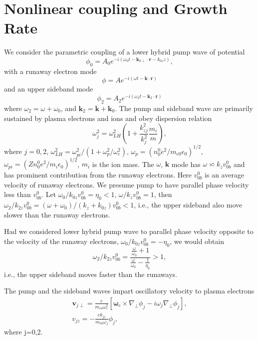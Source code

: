 \documentclass[aip,pop,amsmath,amssymb,showpacs,reprint,floatfix,lengthcheck]{revtex4-1}
\begin{document}
\section{Nonlinear coupling and Growth Rate}
We consider the parametric coupling of a lower hybrid pump wave of potential 
\begin{equation}
\phi_{0}=A_{0} e^{-i(\omega_{0} t -\textbf{k}_{0\perp}\cdot\textbf{r}-k_{0z}z)}, 
\end{equation}
with a runaway electron mode
 \begin{equation}
 \phi=Ae^{-i(\omega t-\textbf{k}\cdot\textbf{r})}
\end{equation}
and an upper sideband mode
\begin{equation}
\phi_{2}=A_{2}e^{-i(\omega_{2} t-\textbf{k}_{2}\cdot\textbf{r})} 
\end{equation}
 where 
 $\omega_{2}=\omega+\omega_{0}$, and $\textbf{k}_{2}=\textbf{k}+\textbf{k}_{0}$.
The pump and sideband wave are primarily sustained by plasma electrons and ions and obey dispersion relation
\begin{equation}
 \omega_{j}^2=\omega_{LH}^2(1+\frac{k_{zj}^2}{k_{j}^2}\frac{m_{i}}{m}),
\end{equation}
where $j=0,2$, $\omega_{LH}^2=\omega_{pi}^2/(1+\omega_{p}^2/\omega_{c}^2)$, $\omega_{p}=(n_{0}^{0}e^2/m_{e0}\epsilon_{0})^{1/2}$, $\omega_{pi}=(Zn_{0}^{0}e^2/m_{i}\epsilon_{0})^{1/2}$, $m_{i}$ is the ion mass.
The $\omega$, $\textbf{k}$ mode has $\omega\backsimeq k_{z}v_{0b}^{0}$ and has prominent contribution from the runaway electrons. Here $v_{0b}^0$ is an average velocity of runaway electrons. We presume pump to have parallel phase velocity less than $v_{0b}^{0}$. Let $\omega_{0}/k_{0z}v_{0b}^{0}=\eta_{0}<1$, $\omega/k_{z}v_{0b}^{0}=1$, then $\omega_{2}/k_{2z}v_{0b}^{0}=(\omega+\omega_{0})/(k_{z}+k_{0z})v_{0b}^{0}
<1$, i.e., the upper sideband also move slower than the runaway electrons.

Had we considered lower hybrid pump wave to parallel phase velocity opposite to the velocity of the runaway electrons, $\omega_{0}/k_{0z}v_{0b}^{0}=-\eta_{0}$, we would obtain
\begin{equation}
 \omega_{2}/k_{2z}v_{0b}^{0}=\frac{\frac{\omega}{\omega_{0}}+1}{\frac{\omega}{\omega_{0}}-\frac{1}{\eta_{0}}}>1,
\end{equation}
i.e., the upper sideband moves faster than the runaways. 

The pump and the sideband waves impart oscillatory velocity to plasma electrons
\begin{eqnarray}
\textbf{v}_{j \perp}=\frac{e}{m_{e0}\omega_{c}^2}[\boldsymbol{\omega}_{c}\times\nabla_{\perp}\phi_{j}-i\omega_{j}\nabla_{\perp}\phi_{j}],\nonumber\\ 
v_{jz}=-\frac{ek_{jz}}{m_{e0}\omega_{j}}\phi_{j},
\end{eqnarray}
where j=0,2.
\end{document}
